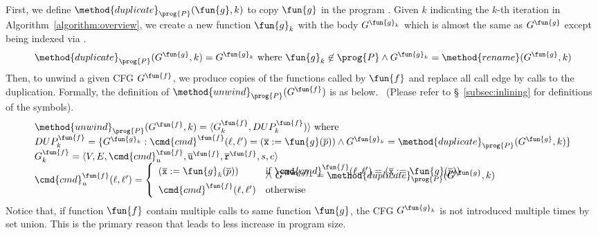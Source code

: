 
First, we define $\method{duplicate}_\prog{P}(\fun{g}, k)$ to copy $\fun{g}$ in
the program .
Given $k$ indicating the $k$-th iteration in Algorithm~\ref{algorithm:overview},
we create a new function $\fun{g}_k$ with the body $G^{\fun{g}_k}$ which is
almost the same as $G^\fun{g}$ except being indexed via .
\[
  \method{duplicate}_\prog{P}(G^\fun{g}, k) = G^{\fun{g}_k} \text{ where }
  \fun{g}_k \not\in \prog{P} \land G^{\fun{g}_k}=\method{rename}(G^\fun{g}, k)
\]
Then, to unwind a given CFG $G^\fun{f}$, we produce copies of the functions
called by $\fun{f}$ and replace all call edge by calls to the duplication.
Formally, the definition of $\method{unwind}_\prog{P}(G^\fun{f})$ is as below.
~(Please refer to \S~\ref{subsec:inlining} for definitions of the symbols).
\[
\begin{array}{l}
\method{unwind}_\prog{P}(G^\fun{f}, k)
  = \langle G^\fun{f}_k, DUP^\fun{f}_k) \rangle \text{ where} \\
DUP^\fun{f}_k = \{G^{\fun{g}_k} :
    \cmd{cmd}^\fun{f}(\ell,\ell')=(\overline{\texttt{x}}:=\fun{g}(\overline{p}))
    \land G^{\fun{g}_k} = \method{duplicate}_\prog{P}(G^\fun{g}, k)
  \}\\
G^\fun{f}_k = \langle V, E,\cmd{cmd}_u^\fun{f}, \overline{\texttt{u}}^\fun{f},
      \overline{\texttt{r}}^\fun{f},s,e \rangle \\
{%
\cmd{cmd}_u^\fun{f} (\ell, \ell') =
\left\{
  \begin{array}{ll}
  (\overline{\texttt{x}}:=\fun{g}_k(\overline{p})) &\text{if } 
    \cmd{cmd}^\fun{f}(\ell,\ell')=(\overline{\texttt{x}}:=\fun{g}(\overline{p})) \\[-8pt]
  & \land\ G^{\fun{g}_k} = \method{duplicate}_\prog{P}(G^\fun{g}, k)\\
  \cmd{cmd}^\fun{f}(\ell,\ell') &\text{otherwise}
  \end{array}
\right.
}
\end{array}
\]
Notice that, if function $\fun{f}$ contain multiple calls to same function
$\fun{g}$,
the CFG $G^{\fun{g}_k}$ is not introduced multiple times by set union.
This is the primary reason that leads to less increase in program size.

